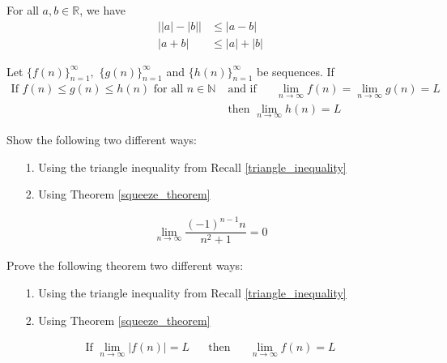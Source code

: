 \begin{recall}
For all $a, b \in \mathbb{R}$, we have
\begin{align*}
    \Big\lvert \lvert a \rvert - \lvert b \rvert \Big\rvert &\leq \lvert a - b \rvert \\[2ex]
    \lvert a + b \rvert &\leq \lvert a \rvert + \lvert b \rvert
\end{align*}
\label{triangle_inequality}
\end{recall}

\begin{theorem}
Let $\{f(n)\}_{n=1}^{\infty}, \hspace{4pt} \{g(n)\}_{n=1}^{\infty}$ and $\{h(n)\}_{n=1}^{\infty}$ be sequences. If
\begin{align*}
    \text{If} \hspace{4pt} f(n)\leq g(n)\leq h(n) \hspace{4pt} \text{for all} \hspace{4pt} n \in \mathbb{N} \hspace{20pt}
    & \text{and if}  \hspace{20pt} \lim_{n \longrightarrow \infty} f(n) = \lim_{n \longrightarrow \infty} g(n) = L \\[2ex]
    & \text{then} \hspace{4pt} \lim_{n \longrightarrow \infty} h(n) = L 
\end{align*}
\label{squeeze_theorem}
\end{theorem}

\begin{exercise}
Show the following two different ways:
\begin{itemize}
    \item [1.] Using the triangle inequality from Recall \ref{triangle_inequality}
    \item [2.] Using Theorem \ref{squeeze_theorem}
\end{itemize}
\begin{align*}
    \lim_{n \longrightarrow \infty} \dfrac{(-1)^{n-1}n}{n^{2}+1} = 0
\end{align*}
\end{exercise}

\begin{exercise}
Prove the following theorem two different ways:
\begin{itemize}
    \item [1.] Using the triangle inequality from Recall \ref{triangle_inequality}
    \item [2.] Using Theorem \ref{squeeze_theorem}
\end{itemize}
\begin{align*}
    \text{If} \hspace{4pt} \lim_{n \longrightarrow \infty} \lvert f(n) \rvert = L \hspace{20pt} \text{then} \hspace{20pt} \lim_{n \longrightarrow \infty} f(n) = L
\end{align*}
\end{exercise}

